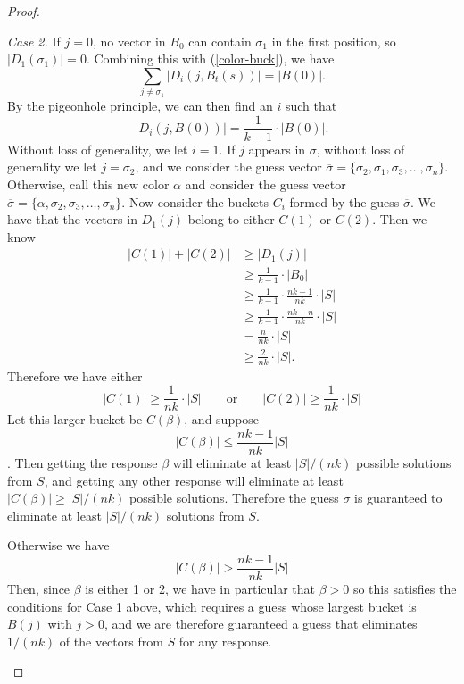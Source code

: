 \documentclass[12pt, a4paper]{article}
\begin{document}
\begin{proof}
\begin{enumerate}[label=\roman*.]
	
	\textit{Case 2.} If $j=0$, no vector in $B_0$ can contain $\sigma_1$ in the first position, so $|D_1(\sigma_1)| = 0$. 
	Combining this with (\ref{color-buck}), we have
	\begin{equation*}
	\sum_{j \neq \sigma_1} |D_i(j,B_t(s))| = |B(0)|.
	\end{equation*}
	By the pigeonhole principle, we can then find an $i$ such that
	\begin{equation*}
	|D_i(j,B(0))| = \frac{1}{k-1}\cdot|B(0)|.
	\end{equation*}
	Without loss of generality, we let $i = 1$. If $j$ appears in $\sigma$, without loss of generality we let $j = \sigma_2$, and
	we consider the guess vector
	$\overline{\sigma}=\{\sigma_2, \sigma_1, \sigma_3, \ldots, \sigma_n\}$.
	Otherwise, call this new color $\alpha$ and consider the guess vector
	$\overline{\sigma}=\{\alpha, \sigma_2, \sigma_3, \ldots, \sigma_n\}$.
	Now consider the
	buckets $C_i$ formed by the guess $\overline{\sigma}$. 
	We have that the vectors in $D_1(j)$ belong to either $C(1)$ or $C(2)$.
	Then we know
	\begin{align*}
	|C(1)|+|C(2)| & \ge |D_1(j)|\\
	& \ge \frac{1}{k-1}\cdot |B_0|\\
	& \ge \frac{1}{k-1}\cdot\frac{nk-1}{nk}\cdot|S|\\
	& \ge \frac{1}{k-1}\cdot\frac{nk-n}{nk}\cdot|S|\\
	& = \frac{n}{nk}\cdot|S|\\
	& \ge \frac{2}{nk}\cdot|S|.
	\end{align*}
	Therefore we have either
	\begin{equation*}
	|C(1)|\ge\frac{1}{nk}\cdot|S|\qquad\text{or}
	\qquad|C(2)|\ge\frac{1}{nk}\cdot|S|
	\end{equation*}
	Let this larger bucket be $C(\beta)$, and suppose
	\begin{equation*}|C(\beta)|\le\frac{nk-1}{nk}|S|\end{equation*}.
	Then getting the response $\beta$ will eliminate at least $|S|/(nk)$
	possible solutions from $S$, and getting any other response will
	eliminate at least $|C(\beta)|\ge |S|/(nk)$ possible solutions. Therefore
	the guess $\overline{\sigma}$ is guaranteed to eliminate at least
	$|S|/(nk)$ solutions from $S$.
	
	Otherwise we have
	\begin{equation*}|C(\beta)|>\frac{nk-1}{nk}|S|\end{equation*}
	Then, since $\beta$ is either 1 or 2, we have in particular that $\beta > 0$ so this satisfies the conditions for Case 1 above, which requires a
	guess whose largest bucket is $B(j)$ with $j>0$, and we are therefore guaranteed a guess that eliminates $1/(nk)$ of the vectors from $S$ for any response.
	\end{enumerate}
	
	
\end{proof}


\clearpage


\end{document}

